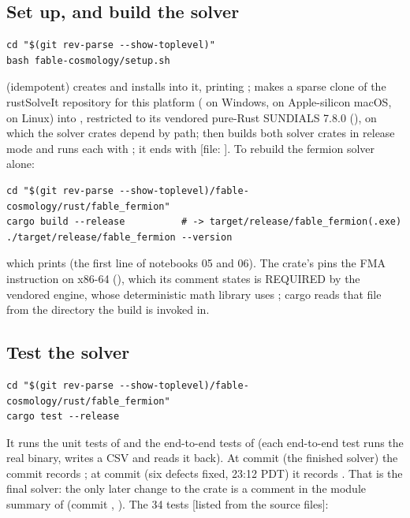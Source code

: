 \subsection{Set up, and build the solver}
\label{sec:11.1}

\begin{Verbatim}
cd "$(git rev-parse --show-toplevel)"
bash fable-cosmology/setup.sh
\end{Verbatim}
 (idempotent) creates  and installs  into it,
printing ; makes a sparse clone of the rustSolveIt
repository for this platform ( on Windows,
 on Apple-silicon macOS,
 on Linux) into , restricted to its
vendored pure-Rust SUNDIALS 7.8.0 (), on which the solver crates depend by path; then builds
both solver crates in release mode and runs each with ; it ends with
 [file: ]. To rebuild the fermion solver alone:
\begin{Verbatim}
cd "$(git rev-parse --show-toplevel)/fable-cosmology/rust/fable_fermion"
cargo build --release          # -> target/release/fable_fermion(.exe)
./target/release/fable_fermion --version
\end{Verbatim}
which prints  (the first line of
notebooks 05 and 06). The crate's  pins the FMA instruction on x86-64
(), which its comment states is REQUIRED by the vendored
 engine, whose deterministic math library uses ; cargo reads that file
from the directory the build is invoked in.

\subsection{Test the solver}
\label{sec:11.2}

\begin{Verbatim}
cd "$(git rev-parse --show-toplevel)/fable-cosmology/rust/fable_fermion"
cargo test --release
\end{Verbatim}
It runs the unit tests of  and the end-to-end tests of  (each end-to-end
test runs the real binary, writes a CSV and reads it back). At commit  (the finished solver)
the commit records ; at commit
 (six defects fixed, 23:12 PDT) it records
. That is the final solver: the only later
change to the crate is a comment in the module summary of  (commit ,
). The 34 tests [listed from the source files]:

